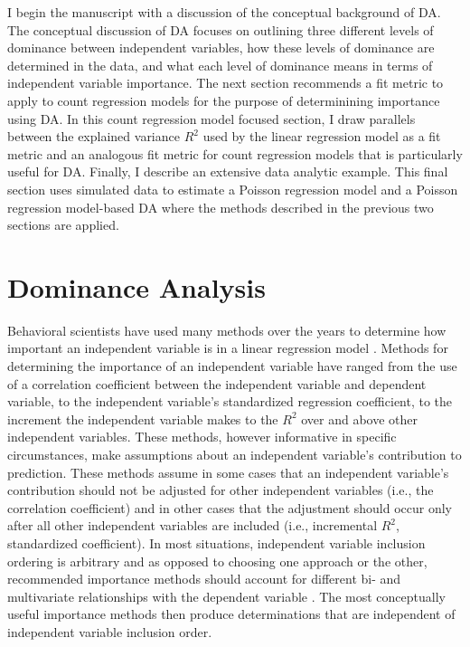 \documentclass[man]{apa7}
\begin{document}
	I begin the manuscript with a discussion of the conceptual background of DA.
	The conceptual discussion of DA focuses on outlining three different levels of dominance between independent variables, how these levels of dominance are determined in the data, and what each level of dominance means in terms of independent variable importance.
	The next section recommends a fit metric to apply to count regression models for the purpose of determinining importance using DA.
	In this count regression model focused section, I draw parallels between the explained variance $R^2$ used by the linear regression model as a fit metric and an analogous fit metric for count regression models that is particularly useful for DA.
	Finally, I describe an extensive data analytic example.
	This final section uses simulated data to estimate a Poisson regression model and a Poisson regression model-based DA where the methods described in the previous two sections are applied.
		
\section{Dominance Analysis}

	Behavioral scientists have used many methods over the years to determine how important an independent variable is in a linear regression model \parencite[see reviews in][]{gromping2007estimators, johnson2004history}.
	Methods for determining the importance of an independent variable have ranged from the use of a correlation coefficient between the independent variable and dependent variable, to the independent variable's standardized regression coefficient, to the increment the independent variable makes to the $R^2$ over and above other independent variables.
	These methods, however informative in specific circumstances, make assumptions about an independent variable's contribution to prediction.
	These methods assume in some cases that an independent variable's contribution should not be adjusted for other independent variables (i.e., the correlation coefficient) and in other cases that the adjustment should occur only after all other independent variables are included (i.e., incremental $R^2$, standardized coefficient).
	In most situations, independent variable inclusion ordering is arbitrary and as opposed to choosing one approach or the other, recommended importance methods should account for different bi- and multivariate relationships with the dependent variable \parencite{johnson2004history}.
	The most conceptually useful importance methods then produce determinations that are independent of independent variable inclusion order.
	
\end{document}
